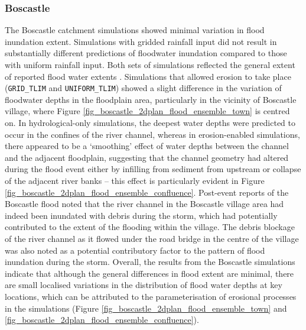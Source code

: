 \subsubsection{Boscastle}
The Boscastle catchment simulations showed minimal variation in flood inundation extent. Simulations with gridded rainfall input did not result in substantially different predictions of floodwater inundation compared to those with uniform rainfall input. Both sets of simulations reflected the general extent of reported flood water extents \citep{wallingford2005flooding}. Simulations that allowed erosion to take place (\texttt{GRID\_TLIM} and \texttt{UNIFORM\_TLIM}) showed a slight difference in the variation of floodwater depths in the floodplain area, particularly in the vicinity of Boscastle village, where Figure \ref{fig_boscastle_2dplan_flood_ensemble_town} is centred on. In hydrological-only simulations, the deepest water depths were predicted to occur in the confines of the river channel, whereas in erosion-enabled simulations, there appeared to be a `smoothing' effect of water depths between the channel and the adjacent floodplain, suggesting that the channel geometry had altered during the flood event either by infilling from sediment from upstream or collapse of the adjacent river banks -- this effect is particularly evident in Figure \ref{fig_boscastle_2dplan_flood_ensemble_confluence}. Post-event reports of the Boscastle flood noted that the river channel in the Boscastle village area had indeed been inundated with debris during the storm, which had potentially contributed to the extent of the flooding within the village. The debris blockage of the  river channel as it flowed under the road bridge in the centre of the village was also noted as a potential contributory factor to the pattern of flood inundation during the storm. Overall, the results from the Boscastle simulations indicate that although the general differences in flood extent are minimal, there are small localised variations in the distribution of flood water depths at key locations, which can be attributed to the parameterisation of erosional processes in the simulations (Figure \ref{fig_boscastle_2dplan_flood_ensemble_town} and \ref{fig_boscastle_2dplan_flood_ensemble_confluence}).

